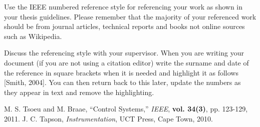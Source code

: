 Use the IEEE numbered reference style for referencing your work as shown in your thesis guidelines.
Please remember that the majority of your referenced work should be from journal articles, technical
reports and books not online sources such as Wikipedia.

Discuss the referencing style with your supervisor. When you are writing your document (if you are not using a citation editor) write the surname and date of the reference in square brackets when it is needed and highlight it as follows [Smith, 2004]. You can then return back to this later, update the numbers as they appear in text and remove the highlighting.

\begin{thebibliography}{5}
 M. S. Tsoeu and M. Braae, ``Control Systems,'' \emph{IEEE}, {\bf vol. 34(3)}, pp. 123-129, 2011.
 J. C. Tapson, \emph{Instrumentation}, UCT Press, Cape Town, 2010.
\end{thebibliography}
